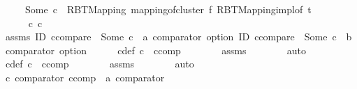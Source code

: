 \begin{isabellebody}
\ \ \ \ {\isacharbar}{\kern0pt}\ Some\ c{\isacharprime}{\kern0pt}\ {\isasymRightarrow}\ {\isacharparenleft}{\kern0pt}RBT{\isacharunderscore}{\kern0pt}Mapping\ {\isacharparenleft}{\kern0pt}mapping{\isacharunderscore}{\kern0pt}of{\isacharunderscore}{\kern0pt}cluster\ f\ {\isacharparenleft}{\kern0pt}RBT{\isacharunderscore}{\kern0pt}Mapping{}{\isachardot}{\kern0pt}impl{\isacharunderscore}{\kern0pt}of\ t{\isacharparenright}{\kern0pt}{\isacharparenright}{\kern0pt}{\isacharparenright}{\kern0pt}{\isacharparenright}{\kern0pt}{\isacharparenright}{\kern0pt}{\isachardoublequoteclose}\isanewline
%
\isadelimproof
%
\endisadelimproof
%
\isatagproof
{}\isamarkupfalse%
\ {\isacharminus}{\kern0pt}\isanewline
\ \ \isacommand{{\isacharbraceleft}{\kern0pt}}\isamarkupfalse%
\isanewline
\ \ \ \ \isamarkupfalse%
\ c\ c{\isacharprime}{\kern0pt}\isanewline
\ \ \ \ \isamarkupfalse%
\ assms{\isacharcolon}{\kern0pt}\ {\isachardoublequoteopen}ID\ ccompare\ {\isacharequal}{\kern0pt}\ {\isacharparenleft}{\kern0pt}Some\ c\ {\isacharcolon}{\kern0pt}{\isacharcolon}{\kern0pt}\ {\isacharprime}{\kern0pt}a\ comparator\ option{\isacharparenright}{\kern0pt}{\isachardoublequoteclose}\ {\isachardoublequoteopen}ID\ ccompare\ {\isacharequal}{\kern0pt}\ {\isacharparenleft}{\kern0pt}Some\ c{\isacharprime}{\kern0pt}\ {\isacharcolon}{\kern0pt}{\isacharcolon}{\kern0pt}\ {\isacharprime}{\kern0pt}b\ comparator\ option{\isacharparenright}{\kern0pt}{\isachardoublequoteclose}\isanewline
\ \ \ \ \isamarkupfalse%
\ c{\isacharunderscore}{\kern0pt}def{\isacharcolon}{\kern0pt}\ {\isachardoublequoteopen}c\ {\isacharequal}{\kern0pt}\ ccomp{\isachardoublequoteclose}\isanewline
\ \ \ \ \ \ \isamarkupfalse%
\ assms{\isacharparenleft}{\kern0pt}{}{\isacharparenright}{\kern0pt}\isanewline
\ \ \ \ \ \ \isamarkupfalse%
\ auto\isanewline
\ \ \ \ \isamarkupfalse%
\ c{\isacharprime}{\kern0pt}{\isacharunderscore}{\kern0pt}def{\isacharcolon}{\kern0pt}\ {\isachardoublequoteopen}c{\isacharprime}{\kern0pt}\ {\isacharequal}{\kern0pt}\ ccomp{\isachardoublequoteclose}\isanewline
\ \ \ \ \ \ \isamarkupfalse%
\ assms{\isacharparenleft}{\kern0pt}{}{\isacharparenright}{\kern0pt}\isanewline
\ \ \ \ \ \ \isamarkupfalse%
\ auto\isanewline
\ \ \ \ \isamarkupfalse%
\ c{\isacharcolon}{\kern0pt}\ {\isachardoublequoteopen}comparator\ {\isacharparenleft}{\kern0pt}ccomp\ {\isacharcolon}{\kern0pt}{\isacharcolon}{\kern0pt}\ {\isacharprime}{\kern0pt}a\ comparator{\isacharparenright}{\kern0pt}{\isachardoublequoteclose}\isanewline

\end{isabellebody}
